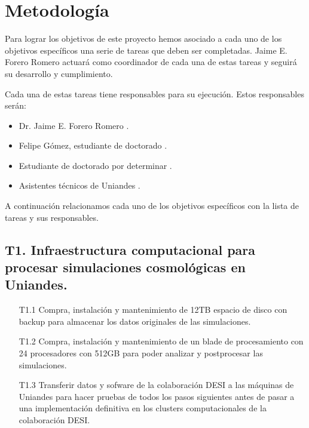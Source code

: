 
\section{Metodolog\'ia}
\label{metodologia}

Para lograr los objetivos de este proyecto hemos asociado a cada uno
de los objetivos espec\'ificos una serie de tareas que deben ser
completadas. Jaime E. Forero Romero actuar\'a como coordinador de cada
una de estas tareas y seguir\'a su desarrollo y cumplimiento. 

Cada una de estas tareas tiene responsables para su ejecuci\'on. Estos
responsables ser\'an:

\begin{itemize}
\item Dr. Jaime E. Forero Romero  \prof.
\item Felipe G\'omez, estudiante de doctorado \gradA.
\item Estudiante de doctorado por determinar \gradB.
\item Asistentes t\'ecnicos de Uniandes \tecn.
\end{itemize}

A continuaci\'on relacionamos cada uno de los objetivos espec\'ificos
con la lista de tareas y sus responsables. 

\subsection*{T1. Infraestructura computacional para procesar simulaciones cosmol\'ogicas en Uniandes.} 
\begin{itemize}
\item[T1.1] \tecn 
Compra, instalaci\'on y mantenimiento de 12TB espacio de disco
  con backup para almacenar los datos originales de las simulaciones.
\item[T1.2] \tecn 
  Compra, instalaci\'on y mantenimiento de un blade de
  procesamiento con 24 procesadores con 512GB para poder analizar y
  postprocesar las simulaciones.
\item[T1.3] \tecn\prof 
  Transferir datos y sofware de la colaboraci\'on
  DESI a las m\'aquinas de Uniandes para hacer pruebas de todos los
  pasos siguientes antes de pasar a una implementaci\'on definitiva en
  los clusters computacionales de la colaboraci\'on DESI. 
\end{itemize}


